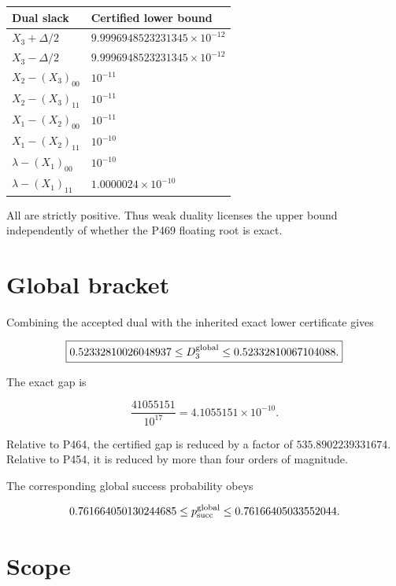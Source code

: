 \documentclass[11pt,a4paper,openany]{report}
\begin{document}
\begin{center}
\begingroup\small
\setlength{\tabcolsep}{2.5pt}
\renewcommand{\arraystretch}{1.16}
\begin{longtable}{@{}p{}p{}@{}}
\toprule
\textbf{Dual slack} & \textbf{Certified lower bound} \\
\midrule
\endhead
\(X_3+\Delta/2\) & \(9.9996948523231345\times10^{-12}\) \\
\(X_3-\Delta/2\) & \(9.9996948523231345\times10^{-12}\) \\
\(X_2-(X_3)_{00}\) & \(10^{-11}\) \\
\(X_2-(X_3)_{11}\) & \(10^{-11}\) \\
\(X_1-(X_2)_{00}\) & \(10^{-11}\) \\
\(X_1-(X_2)_{11}\) & \(10^{-10}\) \\
\(\lambda-(X_1)_{00}\) & \(10^{-10}\) \\
\(\lambda-(X_1)_{11}\) & \(1.0000024\times10^{-10}\) \\
\bottomrule
\end{longtable}
\endgroup
\end{center}

All are strictly positive. Thus weak duality licenses the upper bound independently of whether the P469 floating root is exact.

\section{Global bracket}

Combining the accepted dual with the inherited exact lower certificate gives

\[
\boxed{
0.52332810026048937
\le D_3^{\rm global}\le
0.52332810067104088.}
\]

The exact gap is

\[
\boxed{
\frac{41055151}{10^{17}}
=4.1055151\times10^{-10}.}
\]

Relative to P464, the certified gap is reduced by a factor of \(535.8902239331674\). Relative to P454, it is reduced by more than four orders of magnitude.

The corresponding global success probability obeys

\[
0.761664050130244685
\le p_{\rm succ}^{\rm global}\le
0.76166405033552044.
\]

\section{Scope}
\end{document}
